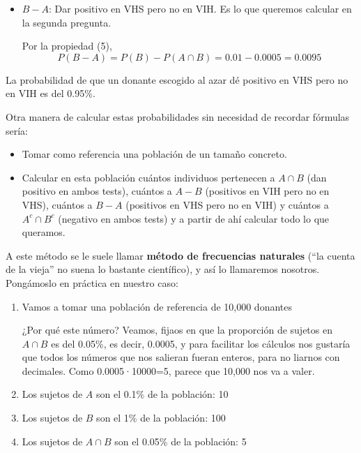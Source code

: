 \documentclass[
  spanish,
  letterpaper,
  DIV=11,
  numbers=noendperiod]{scrreprt}
\begin{document}
\begin{tcolorbox}
\begin{itemize}
  Por la propiedad (8): \[
  P(A \cup B) =P(A)+P(B)-P(A\cap B)=0.001+0.01-0.0005=0.0105
  \] La probabilidad de que un donante escogido al azar dé positivo en
  al menos uno de los dos tests es del 1.05\%.
\item
  \(B-A\): Dar positivo en VHS pero no en VIH. Es lo que queremos
  calcular en la segunda pregunta.

  Por la propiedad (5), \[
  P(B-A)=P(B)-P(A\cap B)=0.01-0.0005=0.0095
  \]
\end{itemize}

La probabilidad de que un donante escogido al azar dé positivo en VHS
pero no en VIH es del 0.95\%.

Otra manera de calcular estas probabilidades sin necesidad de recordar
fórmulas sería:

\begin{itemize}
\item
  Tomar como referencia una población de un tamaño concreto.
\item
  Calcular en esta población cuántos individuos pertenecen a \(A\cap B\)
  (dan positivo en ambos tests), cuántos a \(A-B\) (positivos en VIH
  pero no en VHS), cuántos a \(B-A\) (positivos en VHS pero no en VIH) y
  cuántos a \(A^c\cap B^c\) (negativo en ambos tests) y a partir de ahí
  calcular todo lo que queramos.
\end{itemize}

A este método se le suele llamar \textbf{método de frecuencias
naturales} (``la cuenta de la vieja'' no suena lo bastante científico),
y así lo llamaremos nosotros. Pongámoslo en práctica en nuestro caso:

\begin{enumerate}
\def\labelenumi{\arabic{enumi}.}
\item
  Vamos a tomar una población de referencia de 10,000 donantes

  ¿Por qué este número? Veamos, fijaos en que la proporción de sujetos
  en \(A\cap B\) es del 0.05\%, es decir, 0.0005, y para facilitar los
  cálculos nos gustaría que todos los números que nos salieran fueran
  enteros, para no liarnos con decimales. Como 0.0005·10000=5, parece
  que 10,000 nos va a valer.
\item
  Los sujetos de \(A\) son el 0.1\% de la población: 10
\item
  Los sujetos de \(B\) son el 1\% de la población: 100
\item
  Los sujetos de \(A\cap B\) son el 0.05\% de la población: 5


\end{enumerate}
\end{tcolorbox}
\end{document}
